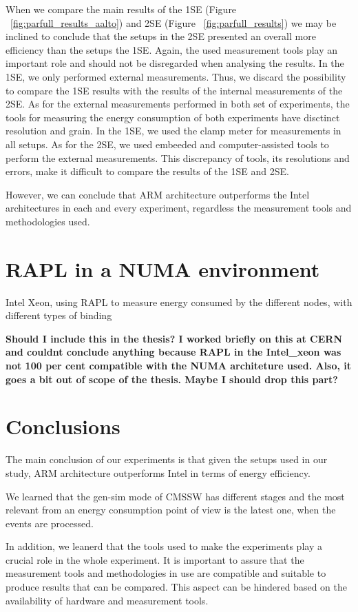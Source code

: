 When we compare the main results of the 1SE (Figure ~\ref{fig:parfull_results_aalto}) and 2SE (Figure ~\ref{fig:parfull_results}) we may be inclined to conclude that the setups in the 2SE presented an overall more efficiency than the setups the 1SE. Again, the used measurement tools play an important role and should not be disregarded when analysing the results. 
In the 1SE, we only performed external measurements. Thus, we discard the possibility to compare the 1SE results with the results of the internal measurements of the 2SE. 
As for the external measurements performed in both set of experiments, the tools for measuring the energy consumption of both experiments have disctinct resolution and grain. In the 1SE, we used the clamp meter for measurements in all setups. As for the 2SE, we used embeeded and computer-assisted tools to perform the external measurements. This discrepancy of tools, its resolutions and errors, make it difficult to compare the results of the 1SE and 2SE.

However, we can conclude that ARM architecture outperforms the Intel architectures in each and every experiment, regardless the measurement tools and methodologies used.

\section{RAPL in a NUMA environment}
Intel Xeon, using RAPL to measure energy consumed by the different nodes, with different types of binding

\textbf{Should I include this in the thesis? I worked briefly on this at CERN and couldnt conclude anything because RAPL in the Intel\_xeon was not 100 per cent compatible with the NUMA architeture used. Also, it goes a bit out of scope of the thesis. Maybe I should drop this part?}


\section{Conclusions}
The main conclusion of our experiments is that given the setups used in our study, ARM architecture outperforms Intel in terms of energy efficiency.

We learned that the gen-sim mode of CMSSW has different stages and the most relevant from an energy consumption point of view is the latest one, when the events are processed.

In addition, we leanerd that the tools used to make the experiments play a crucial role in the whole experiment. It is important to assure that the measurement tools and methodologies in use are compatible and suitable to produce results that can be compared. This aspect can be hindered based on the availability of hardware and measurement tools. 
